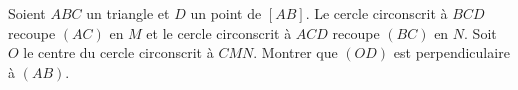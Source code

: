 Soient $ABC$ un triangle et $D$ un point de $[AB]$. Le cercle circonscrit à $BCD$ recoupe $(AC)$ en $M$ et le cercle circonscrit à $ACD$ recoupe $(BC)$ en $N$. Soit $O$ le centre du cercle circonscrit à $CMN$. Montrer que $(OD)$ est perpendiculaire à $(AB)$.
